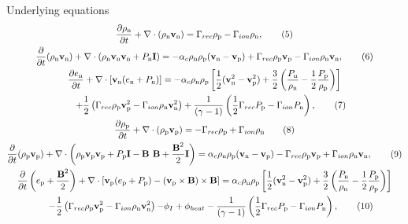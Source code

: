 \documentclass[10pt,aspectratio=169,usenames,dvipsnames]{beamer}
\begin{document}
\begin{frame}{Underlying equations}
\footnotesize
\begin{gather}
\frac{\partial \rho _{\text{n}}}{\partial t} + \nabla \cdot (\rho _{\text{n}} \textbf{v}_{\text{n}})= \Gamma _{rec} \rho _{\rm p} - \Gamma _{ion} \rho _{\rm n}, \label{eqn:neutral1}\tag{5} \\
\frac{\partial}{\partial t}(\rho _{\text{n}} \textbf{v}_{\text{n}}) + \nabla \cdot (\rho _{\text{n}} \textbf{v}_{\text{n}} \textbf{v}_{\text{n}} + P_{\text{n}} \textbf{I}) = -\alpha _c \rho_{\text{n}} \rho_{\text{p}} (\textbf{v}_{\text{n}}-\textbf{v}_{\text{p}}) + \Gamma _{rec} \rho _{\rm p} \textbf{v}_{\rm p} - \Gamma _{ion} \rho_{\rm n} \textbf{v}_{\rm n}, \tag{6}\\
\frac{\partial e_{\text{n}}}{\partial t} + \nabla \cdot \left[\textbf{v}_{\text{n}} (e_{\text{n}} +P_{\text{n}}) \right] = -\alpha _c \rho _{\text{n}} \rho _{\text{p}} \left[ \frac{1}{2} (\textbf{v}_{\text{n}} ^2 - \textbf{v}_{\text{p}} ^2)+ \frac{3}{2} \left(\frac{P_{\rm n}}{\rho_{\rm n}}-\frac{1}{2}\frac{P_{\rm p}}{\rho_{\rm p}}\right) \right] \nonumber \\ \hspace{0.5cm}+ \frac{1}{2} \left( \Gamma _{rec} \rho _{\rm p} \textbf{v}_{\rm p} ^2 - \Gamma _{ion} \rho _{\rm n} \textbf{v}_{\rm n} ^2 \right) +\frac{1}{ (\gamma-1)} \left( \frac{1}{2} \Gamma _{rec} P_{\rm p} -\Gamma _{ion} P_{\rm n} \right), \tag{7}\\
\frac{\partial \rho _{\text{p}}}{\partial t} + \nabla \cdot (\rho_{\text{p}} \textbf{v}_{\text{p}}) = - \Gamma _{rec} \rho _{\rm p} + \Gamma _{ion} \rho _{\rm n} \label{eqn:plasma1}\tag{8}\\
\frac{\partial}{\partial t} (\rho_{\text{p}} \textbf{v}_{\text{p}})+ \nabla \cdot \left( \rho_{\text{p}} \textbf{v}_{\text{p}} \textbf{v}_{\text{p}} + P_{\text{p}} \textbf{I} - \textbf{B B} + \frac{\textbf{B}^2}{2} \textbf{I} \right) = \alpha _c \rho_{\text{n}} \rho_{\text{p}}(\textbf{v}_{\text{n}} - \textbf{v}_{\text{p}}) - \Gamma _{rec} \rho _{\rm p} \textbf{v}_{\rm p} + \Gamma _{ion} \rho_{\rm n} \textbf{v}_{\rm n},\tag{9}\\
\frac{\partial}{\partial t} \left( e_{\text{p}} + \frac{\textbf{B}^2}{2} \right) + \nabla \cdot \left[ \textbf{v}_{\text{p}} ( e_{\text{p}} + P_{\text{p}}) -  (\textbf{v}_{\rm p} \times \textbf{B}) \times \textbf{B} \right]  =  \alpha _c \rho _{\text{n}} \rho _{\text{p}} \left[ \frac{1}{2} (\textbf{v}_{\text{n}} ^2 - \textbf{v}_{\text{p}} ^2)+ \frac{3}{2} \left(\frac{P_{\rm n}}{\rho_{\rm n}}-\frac{1}{2}\frac{P_{\rm p}}{\rho_{\rm p}}\right) \right] \nonumber \\ \hspace{0.5cm}- \frac{1}{2} \left( \Gamma _{rec} \rho _{\rm p} \textbf{v}_{\rm p} ^2 - \Gamma _{ion} \rho _{\rm n} \textbf{v}_{\rm n} ^2 \right) {- \phi_I + \phi_{heat}} -\frac{1}{ (\gamma-1)} \left( \frac{1}{2} \Gamma _{rec} P_{\rm p} -\Gamma _{ion} P_{\rm n} \right), \label{eqn:ep}\tag{10} \\

\end{gather}
\end{frame}
\end{document}
